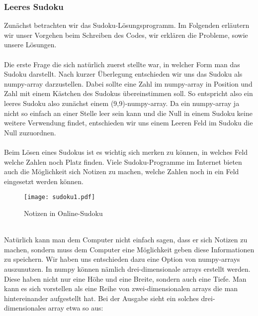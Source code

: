 \documentclass[11pt,a4paper]{article}
\begin{document}
\subsubsection{Leeres Sudoku}
Zunächst betrachten wir das Sudoku-Lösungsprogramm. Im Folgenden erläutern wir unser Vorgehen beim Schreiben des Codes, wir erklären die Probleme, sowie unsere Lösungen.\ \\
\ \\
Die erste Frage die sich natürlich zuerst stellte war, in welcher Form man das Sudoku darstellt. Nach kurzer Überlegung entschieden wir uns das Sudoku als numpy-array darzustellen. Dabei sollte eine Zahl im numpy-array in Position und Zahl mit einem Kästchen des Sudokus übereinstimmen soll. So entspricht also ein leeres Sudoku also zunächst einem (9,9)-numpy-array. Da ein numpy-array ja nicht so einfach an einer Stelle leer sein kann und die Null in einem Sudoku keine weitere Verwendung findet, entschieden wir uns einem Leeren Feld im Sudoku die Null zuzuordnen.\\
\ \\
Beim Lösen eines Sudokus ist es wichtig sich merken zu können, in welches Feld welche Zahlen noch Platz finden. Viele Sudoku-Programme im Internet bieten auch die Möglichkeit sich Notizen zu machen, welche Zahlen noch in ein Feld eingesetzt werden können.  
\ \\
\begin{figure}[htbp!]
\begin{center}
\texttt{[image: sudoku1.pdf]}
\end{center}
\caption{Notizen in Online-Sudoku}
\end{figure}
\ \\
Natürlich kann man dem Computer nicht einfach sagen, dass er sich Notizen zu machen, sondern muss dem Computer eine Möglichkeit geben diese Informationen zu speichern. Wir haben uns entschieden dazu eine Option von numpy-arrays auszunutzen. In numpy können nämlich drei-dimensionale arrays erstellt werden. Diese haben nicht nur eine Höhe und eine Breite, sondern auch eine Tiefe. Man kann es sich vorstellen als eine Reihe von zwei-dimensionalen arrays die man hintereinander aufgestellt hat. Bei der Ausgabe sieht ein solches drei-dimensionales array etwa so aus: 
\newpage
\end{document}
